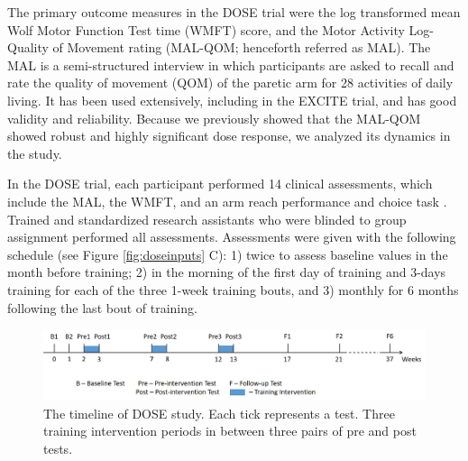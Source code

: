 The primary outcome measures in the DOSE trial were the log transformed mean Wolf Motor Function Test time (WMFT) score, and the Motor Activity Log-Quality of Movement rating (MAL-QOM; henceforth referred as MAL). 
The MAL is a semi-structured interview in which participants are asked to recall and rate the quality of movement (QOM) of the paretic arm for 28 activities of daily living. 
It has been used extensively, including in the EXCITE trial, and has good validity and reliability. 
Because we previously showed that the MAL-QOM showed robust and highly significant dose response, we analyzed its dynamics in the study.

In the DOSE trial, each participant performed 14 clinical assessments, which include the MAL, the WMFT, and an arm reach performance and choice task \cite{Park2016}. 
Trained and standardized research assistants who were blinded to group assignment performed all assessments. 
Assessments were given with the following schedule (see Figure \ref{fig:doseinputs} C): 1) twice to assess baseline values in the month before training; 2) in the morning of the first day of training and 3-days training for each of the three 1-week training bouts, and 3) monthly for 6 months following the last bout of training.  

\begin{figure}
	\centering
	\includegraphics[width=1\linewidth]{figures/dosetimeline}
	\caption[DOSE Study Timeline]{The timeline of DOSE study. Each tick represents a test. Three training intervention periods in between three pairs of pre and post tests.}
	\label{fig:dosetimeline}
\end{figure}

